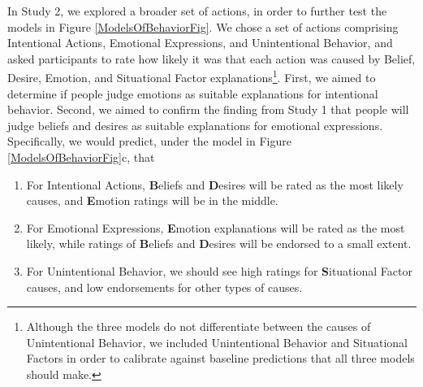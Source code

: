 \documentclass[10pt,letterpaper]{article}
\newcommand{\ndg}[1]{\textcolor{Green}{[ndg: #1]}}
\begin{document}
In Study 2, we explored a broader set of actions, in order to further test the models in Figure \ref{ModelsOfBehaviorFig}. We chose a set of actions comprising Intentional Actions, Emotional Expressions, and Unintentional Behavior, and asked participants to rate how likely it was that each action was caused by Belief, Desire, Emotion, and Situational Factor explanations\footnote{Although the three models do not differentiate between the causes of Unintentional Behavior, we included Unintentional Behavior and Situational Factors in order to calibrate against baseline predictions that all three models should make.
}. First, we aimed to determine if people judge emotions as suitable explanations for intentional behavior. Second, we aimed to confirm the finding from Study 1 that people will judge beliefs and desires as suitable explanations for emotional expressions. 
Specifically, we would predict, under the model in Figure \ref{ModelsOfBehaviorFig}c, that
\begin{enumerate}
\item For Intentional Actions, %
\textbf{B}eliefs and \textbf{D}esires will be rated as the most likely causes, and \textbf{E}motion ratings will be in the middle. %
\item For Emotional Expressions, %
\textbf{E}motion explanations will be rated as the most likely, while ratings of \textbf{B}eliefs and \textbf{D}esires will be endorsed to a small extent. %
\item For Unintentional Behavior, %
we should see high ratings for \textbf{S}ituational Factor causes, and low endorsements for other types of causes. %
\end{enumerate}
\end{document}
